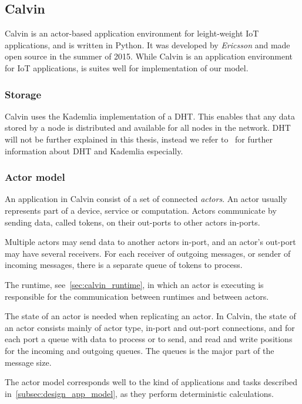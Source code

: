 \documentclass{cslthse-msc}
\begin{document}
\subsection{Calvin} \label{subsec:design_calvin}
Calvin is an actor-based application environment for leight-weight IoT applications, and is written in Python. It was developed by \emph{Ericsson} and made open source in the summer of 2015. While Calvin is an application environment for IoT applications, is suites well for implementation of our model.

\subsubsection{Storage} \label{sec:calvin_storage}
Calvin uses the Kademlia implementation of a DHT. This enables that any data stored by a node is distributed and available for all nodes in the network. DHT will not be further explained in this thesis, instead we refer to~\cite{kademlia} for further information about DHT and Kademlia especially.

\subsubsection{Actor model}
An application in Calvin consist of a set of connected \emph{actors}. An actor usually represents part of a device, service or computation. Actors communicate by sending data, called tokens, on their out-ports to other actors in-ports. 

Multiple actors may send data to another actors in-port, and an actor's out-port may have several receivers. For each receiver of outgoing messages, or sender of incoming messages, there is a separate queue of tokens to process.

The runtime, see~\cref{sec:calvin_runtime}, in which an actor is executing is responsible for the communication between runtimes and between actors.

The state of an actor is needed when replicating an actor. In Calvin, the state of an actor consists mainly of actor type, in-port and out-port connections, and for each port a queue with data to process or to send, and read and write positions for the incoming and outgoing queues. The queues is the major part of the message size.

The actor model corresponds well to the kind of applications and tasks described in~\cref{subsec:design_app_model}, as they perform deterministic calculations.
\end{document}
